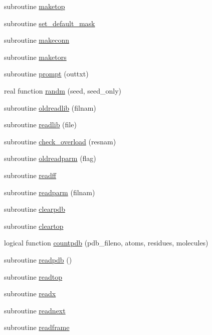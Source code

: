 \begin{DoxyCompactItemize}
subroutine \hyperlink{classprep_ac1b20bb4677de808773357bae4f5b4a5}{maketop}
\item 
subroutine \hyperlink{classprep_a66e2390289edaef47f6dcefb4a185202}{set\-\_\-default\-\_\-mask}
\item 
subroutine \hyperlink{classprep_a94241a6b92f9a195d99d246496af82f1}{makeconn}
\item 
subroutine \hyperlink{classprep_ac846f0515160efb246ed00491918d9b4}{maketors}
\item 
subroutine \hyperlink{classprep_a162b497f3439d96e352c9cb8b4e94cc9}{prompt} (outtxt)
\item 
real function \hyperlink{classprep_a5641b3358b25c1add0aef28b30a9c055}{randm} (seed, seed\-\_\-only)
\item 
subroutine \hyperlink{classprep_a0dedb90780274dad9f0cb73c67bc72c4}{oldreadlib} (filnam)
\item 
subroutine \hyperlink{classprep_a5416ced67e818030602fa86ed687ac6b}{readlib} (file)
\item 
subroutine \hyperlink{classprep_af0136172f3ff29a37f279ae1a8bb3a0c}{check\-\_\-overload} (resnam)
\item 
subroutine \hyperlink{classprep_aa8bce8b46beb9bb1a75090b0ca7666e1}{oldreadparm} (flag)
\item 
subroutine \hyperlink{classprep_a266a5e1af478996cb0484355015fbd31}{readff}
\item 
subroutine \hyperlink{classprep_a95a57c9975f303d860e25611bb7a14ad}{readparm} (filnam)
\item 
subroutine \hyperlink{classprep_a7806a1003fb2bd7b5e4b0defb56cd7c8}{clearpdb}
\item 
subroutine \hyperlink{classprep_ab6d8d62fc9dadbde610b37b9efe4413a}{cleartop}
\item 
logical function \hyperlink{classprep_ab0f4a5ea2c1daf3121ad69cf0c16f40a}{countpdb} (pdb\-\_\-fileno, atoms, residues, molecules)
\item 
subroutine \hyperlink{classprep_a11614f4fd619fd0eb99727e258ca2300}{readpdb} ()
\item 
subroutine \hyperlink{classprep_a59d775f3eb60a2041f8a27c882d3bc70}{readtop}
\item 
subroutine \hyperlink{classprep_ab2a8422cb6cb324200f5b5bf3083675c}{readx}
\item 
subroutine \hyperlink{classprep_ab41936ec09ac09e102a791f2c28d8c37}{readnext}
\item 
subroutine \hyperlink{classprep_a76cc92e2a4be8c7ee740c6ba35b8789b}{readframe}
\item 

\end{DoxyCompactItemize}
